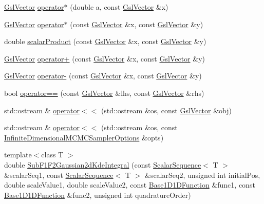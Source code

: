 \begin{DoxyCompactItemize}
\item 
\hyperlink{class_q_u_e_s_o_1_1_gsl_vector}{Gsl\-Vector} \hyperlink{namespace_q_u_e_s_o_ac6209b9b8dde0c23a8d7a239eabcc6b5}{operator$\ast$} (double a, const \hyperlink{class_q_u_e_s_o_1_1_gsl_vector}{Gsl\-Vector} \&x)
\item 
\hyperlink{class_q_u_e_s_o_1_1_gsl_vector}{Gsl\-Vector} \hyperlink{namespace_q_u_e_s_o_adc8f40b553602f8f0e9668d30af42ebe}{operator$\ast$} (const \hyperlink{class_q_u_e_s_o_1_1_gsl_vector}{Gsl\-Vector} \&x, const \hyperlink{class_q_u_e_s_o_1_1_gsl_vector}{Gsl\-Vector} \&y)
\item 
double \hyperlink{namespace_q_u_e_s_o_a159769395a413f58b974587d5f43bbc7}{scalar\-Product} (const \hyperlink{class_q_u_e_s_o_1_1_gsl_vector}{Gsl\-Vector} \&x, const \hyperlink{class_q_u_e_s_o_1_1_gsl_vector}{Gsl\-Vector} \&y)
\item 
\hyperlink{class_q_u_e_s_o_1_1_gsl_vector}{Gsl\-Vector} \hyperlink{namespace_q_u_e_s_o_a4b74ebe52de00d2ea6affde322a158bc}{operator+} (const \hyperlink{class_q_u_e_s_o_1_1_gsl_vector}{Gsl\-Vector} \&x, const \hyperlink{class_q_u_e_s_o_1_1_gsl_vector}{Gsl\-Vector} \&y)
\item 
\hyperlink{class_q_u_e_s_o_1_1_gsl_vector}{Gsl\-Vector} \hyperlink{namespace_q_u_e_s_o_ae873227c9725013266467750e1fbad72}{operator-\/} (const \hyperlink{class_q_u_e_s_o_1_1_gsl_vector}{Gsl\-Vector} \&x, const \hyperlink{class_q_u_e_s_o_1_1_gsl_vector}{Gsl\-Vector} \&y)
\item 
bool \hyperlink{namespace_q_u_e_s_o_a18841f416975b3d80dfefa99a9ad0c15}{operator==} (const \hyperlink{class_q_u_e_s_o_1_1_gsl_vector}{Gsl\-Vector} \&lhs, const \hyperlink{class_q_u_e_s_o_1_1_gsl_vector}{Gsl\-Vector} \&rhs)
\item 
std\-::ostream \& \hyperlink{namespace_q_u_e_s_o_a25bb97988816bba6f17d35884da60512}{operator$<$$<$} (std\-::ostream \&os, const \hyperlink{class_q_u_e_s_o_1_1_gsl_vector}{Gsl\-Vector} \&obj)
\item 
std\-::ostream \& \hyperlink{namespace_q_u_e_s_o_a30313c4aa1faccd51c175757a7f4eb61}{operator$<$$<$} (std\-::ostream \&os, const \hyperlink{class_q_u_e_s_o_1_1_infinite_dimensional_m_c_m_c_sampler_options}{Infinite\-Dimensional\-M\-C\-M\-C\-Sampler\-Options} \&opts)
\item 
{\footnotesize template$<$class T $>$ }\\double \hyperlink{namespace_q_u_e_s_o_a8c82b1fac926f75ad3e18cbd2d6a1b9d}{Sub\-F1\-F2\-Gaussian2d\-Kde\-Integral} (const \hyperlink{class_q_u_e_s_o_1_1_scalar_sequence}{Scalar\-Sequence}$<$ T $>$ \&scalar\-Seq1, const \hyperlink{class_q_u_e_s_o_1_1_scalar_sequence}{Scalar\-Sequence}$<$ T $>$ \&scalar\-Seq2, unsigned int initial\-Pos, double scale\-Value1, double scale\-Value2, const \hyperlink{class_q_u_e_s_o_1_1_base1_d1_d_function}{Base1\-D1\-D\-Function} \&func1, const \hyperlink{class_q_u_e_s_o_1_1_base1_d1_d_function}{Base1\-D1\-D\-Function} \&func2, unsigned int quadrature\-Order)

\end{DoxyCompactItemize}
